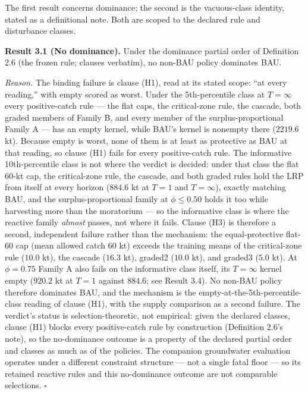The first result concerns dominance; the second is the vacuous-class
identity, stated as a definitional note. Both are scoped to the declared
rule and disturbance classes.

\textbf{Result 3.1 (No dominance).} Under the dominance partial order of
Definition 2.6 (the frozen rule; clauses verbatim), no non-BAU policy
dominates BAU.

\emph{Reason.} The binding failure is clause (H1), read at its stated
scope: ``at every reading,'' with empty scored as worst. Under the
5th-percentile class at \(T=\infty\) every positive-catch rule --- the
flat caps, the critical-zone rule, the cascade, both graded members of
Family B, and every member of the surplus-proportional Family A --- has
an empty kernel, while BAU's kernel is nonempty there (\(2219.6\) kt).
Because empty is worst, none of them is at least as protective as BAU at
that reading, so clause (H1) fails for every positive-catch rule. The
informative 10th-percentile class is not where the verdict is decided:
under that class the flat 60-kt cap, the critical-zone rule, the
cascade, and both graded rules hold the LRP from itself at every horizon
(\(884.6\) kt at \(T=1\) and \(T=\infty\)), exactly matching BAU, and
the surplus-proportional family at \(\phi \le 0.50\) holds it too while
harvesting more than the moratorium --- so the informative class is
where the reactive family \emph{almost} passes, not where it fails.
Clause (H3) is therefore a second, independent failure rather than the
mechanism: the equal-protective flat-60 cap (mean allowed catch \(60\)
kt) exceeds the training means of the critical-zone rule (\(10.0\) kt),
the cascade (\(16.3\) kt), graded2 (\(10.0\) kt), and graded3 (\(5.0\)
kt). At \(\phi = 0.75\) Family A also fails on the informative class
itself, its \(T=\infty\) kernel empty (\(920.2\) kt at \(T=1\) against
\(884.6\); see Result 3.4). No non-BAU policy therefore dominates BAU,
and the mechanism is the empty-at-the-5th-percentile-class reading of
clause (H1), with the supply comparison as a second failure. The
verdict's status is selection-theoretic, not empirical: given the
declared classes, clause (H1) blocks every positive-catch rule by
construction (Definition 2.6's note), so the no-dominance outcome is a
property of the declared partial order and classes as much as of the
policies. The companion groundwater evaluation operates under a
different constraint structure --- not a single fatal floor --- so its
retained reactive rules and this no-dominance outcome are not comparable
selections. \ensuremath{\square}

